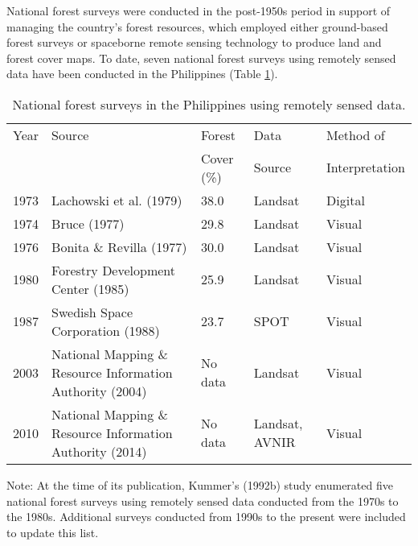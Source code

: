 National forest surveys were conducted in the post-1950s period in support of managing the country's forest resources, which employed either ground-based forest surveys or spaceborne remote sensing technology to produce land and forest cover maps. To date, seven national forest surveys using remotely sensed data have been conducted in the Philippines (Table \ref{tab: intro-table1.1}).

\begin{spacing}{1.0}
\begin{longtable}[h!]{ p{1cm} p{5.4cm} p{2.2cm} p{1.9cm} p{2.5cm} }

    \caption[National forest surveys in the Philippines using remotely sensed data.]{National forest surveys in the Philippines using remotely sensed data.}
    \label{tab: intro-table1.1}\\
    
    	\toprule
    	Year & Source & Forest & Data & Method of\\ 
		{} & {} & Cover (\%) & Source & Interpretation\\ 
    	\midrule
    	\endhead
    	
		1973 & Lachowski et al. (1979) & 38.0 & Landsat & Digital\\
		1974 & Bruce (1977) & 29.8 & Landsat & Visual\\ 
		1976 & Bonita \& Revilla (1977) & 30.0 & Landsat & Visual\\ 
		1980 & Forestry Development Center (1985) & 25.9 & Landsat & Visual\\
		1987 & Swedish Space Corporation (1988) & 23.7 & SPOT & Visual\\
		2003 & National Mapping \& Resource Information Authority (2004) & No data & Landsat & Visual\\
		2010 & National Mapping \& Resource Information Authority (2014) & No data & Landsat, AVNIR & Visual\\ 
				
    	\bottomrule
    
\end{longtable}

	\noindent Note: At the time of its publication, Kummer's (1992b) study enumerated five national forest surveys using remotely sensed data conducted from the 1970s to the 1980s. Additional surveys conducted from 1990s to the present were included to update this list.\\ \newline
	
\end{spacing}

